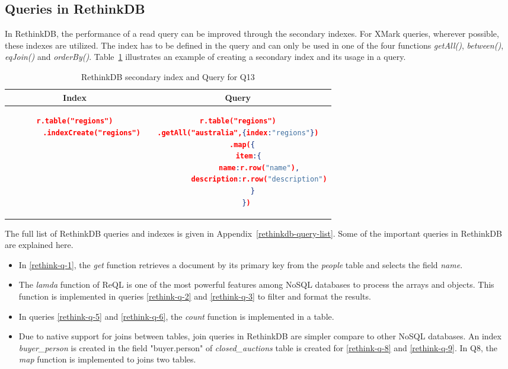 \subsection{Queries in RethinkDB}

In RethinkDB, the performance of a read query can be improved through the secondary indexes. For XMark queries,  wherever possible, these indexes are utilized. The index has to be defined in the query and can only be used in one of the four functions \textit{getAll()}, \textit{between()}, \textit{eqJoin()} and \textit{orderBy()}. Table~\ref{tbl:rethinkdb-index-query} illustrates an example of creating a secondary index and its usage in a query.
\begin{longtable}{c|c}
	\caption{ RethinkDB secondary index and Query for Q13}
	\label{tbl:rethinkdb-index-query}\\
    {Index} & {Query}\\
	\hline
\begin{minipage}{.3\textwidth}
\begin{lstlisting}[language=JSON,basicstyle=\ttfamily\footnotesize]
    r.table("regions")
        .indexCreate("regions")
\end{lstlisting}
\end{minipage} &
\begin{minipage}{.5\textwidth}
\begin{lstlisting}[language=JSON,basicstyle=\ttfamily\footnotesize]
r.table("regions")
.getAll("australia",{index:"regions"})
    .map({  
       item:{  
          name:r.row("name"),
          description:r.row("description")
       }
    })
\end{lstlisting}
\end{minipage}
\end{longtable}
The full list of RethinkDB queries and indexes is given in Appendix~\ref{rethinkdb-query-list}. 
Some of the important queries in RethinkDB are explained here.

\begin{itemize}
\item  In \ref{rethink-q-1}, the \textit{get} function retrieves a document by its primary key from the \textit{people} table and selects the field \textit{name}.   

\item  The \textit{lamda} function of ReQL is one of the most powerful features among NoSQL databases to process the arrays and objects. This function is implemented in  queries \ref{rethink-q-2} and \ref{rethink-q-3} to filter and format the results. 

\item 
 In queries \ref{rethink-q-5} and \ref{rethink-q-6}, the \textit{count} function is implemented in a table. 
  \item Due to native support for joins between tables, join queries in RethinkDB are simpler compare to other NoSQL databases. An index \textit{buyer\_person} is created in the field "buyer.person" of \textit{closed\_auctions} table is created for \ref{rethink-q-8} and \ref{rethink-q-9}. In Q8, the \textit{map} function is implemented to joins two tables.

\end{itemize}

